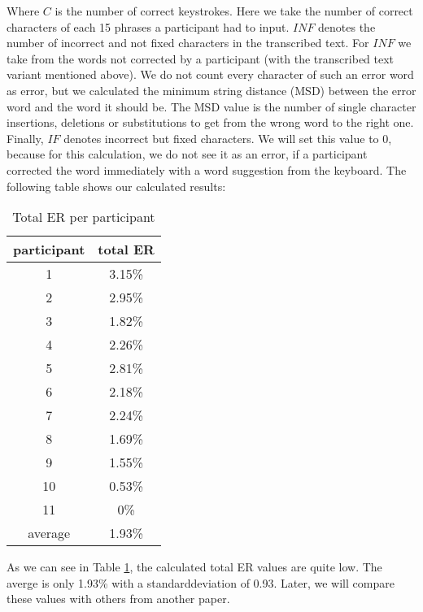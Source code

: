 Where $C$ is the number of correct keystrokes. Here we take the number of correct characters of each 15 phrases a participant had to input. $INF$ denotes the number of incorrect and not fixed characters in the transcribed text. For $INF$ we take from the words not corrected by a participant (with the transcribed text variant mentioned above). We do not count every character of such an error word as error, but we calculated the minimum string distance (MSD) between the error word and the word it should be. The MSD value is the number of single character insertions, deletions or substitutions to get from the wrong word to the right one. Finally, $IF$ denotes incorrect but fixed characters. We will set this value to 0, because for this calculation, we do not see it as an error, if a participant corrected the word immediately with a word suggestion from the keyboard. The following table shows our calculated results:
\label{sec:total_er}
\begin{table}[H]
    \centering
    \caption{Total ER per participant}
    \begin{tabular}{cc} \toprule
        participant&total ER\\ \midrule
        1&3.15\%\\
        2&2.95\%\\
        3&1.82\%\\
        4&2.26\%\\
        5&2.81\%\\
        6&2.18\%\\
        7&2.24\%\\
        8&1.69\%\\
        9&1.55\%\\
        10&0.53\%\\
        11&0\%\\\bottomrule
        average&1.93\%\\
        \bottomrule
    \end{tabular}
    \label{tab:wpm_compare}
\end{table}
As we can see in Table \ref{tab:wpm_compare}, the calculated total ER values are quite low. The averge is only 1.93\% with a standarddeviation of 0.93. Later, we will compare these values with others from another paper.\\

